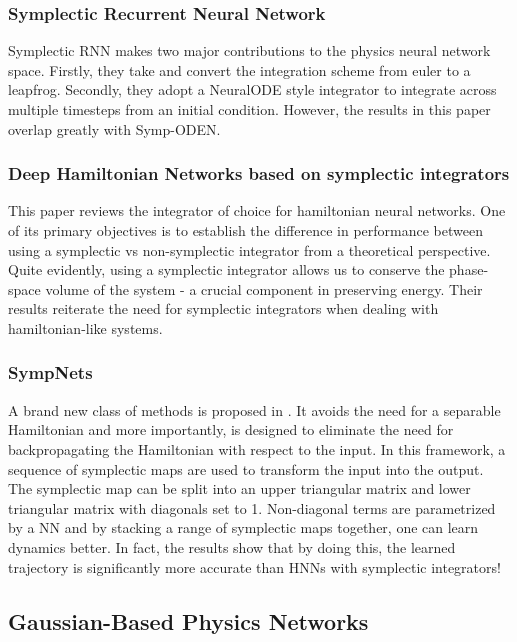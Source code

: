 \documentclass{article}
\begin{document}
\subsubsection{Symplectic Recurrent Neural Network}

Symplectic RNN \cite{chen_symplectic_2020} makes two major contributions to the physics neural network space. Firstly, they take  and convert the integration scheme from euler to a leapfrog. Secondly, they adopt a NeuralODE style integrator to integrate across multiple timesteps from an initial condition. However, the results in this paper overlap greatly with Symp-ODEN. 

\subsubsection{Deep Hamiltonian Networks based on symplectic integrators}

This paper \cite{zhu_deep_2020} reviews the integrator of choice for hamiltonian neural networks. One of its primary objectives is to establish the difference in performance between using a symplectic vs non-symplectic integrator from a theoretical perspective. Quite evidently, using a symplectic integrator allows us to conserve the phase-space volume of the system - a crucial component in preserving energy. Their results reiterate the need for symplectic integrators when dealing with hamiltonian-like systems.

\subsubsection{SympNets}

A brand new class of methods is proposed in \cite{jin_sympnets_2020}. It avoids the need for a separable Hamiltonian and more importantly, is designed to eliminate the need for backpropagating the Hamiltonian with respect to the input. In this framework, a sequence of symplectic maps are used to transform the input into the output. The symplectic map can be split into an upper triangular matrix and lower triangular matrix with diagonals set to 1. Non-diagonal terms are parametrized by a NN and by stacking a range of symplectic maps together, one can learn dynamics better. In fact, the results show that by doing this, the learned trajectory is significantly more accurate than HNNs with symplectic integrators!

\subsection{Gaussian-Based Physics Networks}
\end{document}
